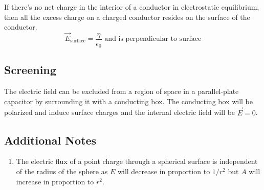 \documentclass{article}
\begin{document}
If there's no net charge in the interior of a conductor in electrostatic equilibrium, then all the
excess charge on a charged conductor resides on the surface of the conductor.
\[\vec{E}_{\text{surface}}=\frac{\eta}{\epsilon_0}\text{ and is perpendicular to surface}\]

\subsection*{Screening}
The electric field can be excluded from a region of space in a parallel-plate capacitor by
surrounding it with a conducting box. The conducting box will be polarized and induce surface
charges and the internal electric field will be $\vec{E}=0$.

\subsection*{Additional Notes}
\begin{enumerate}
    \item The electric flux of a point charge through a spherical surface is independent of the
    radius of the sphere as $E$ will decrease in proportion to $1/r^2$ but $A$ will increase in
    proportion to $r^2$.
\end{enumerate}
\end{document}
